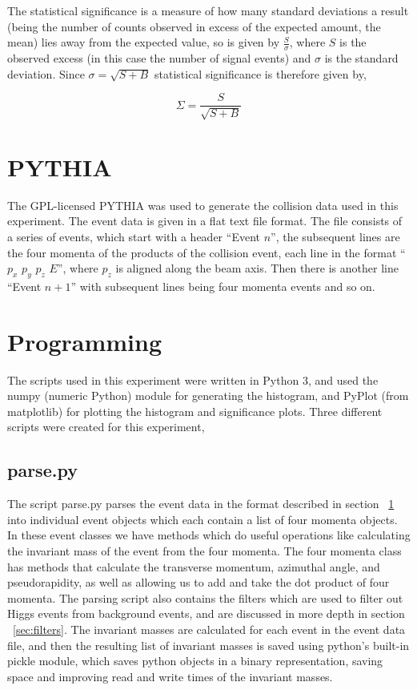 \documentclass[11pt]{amsart}
\begin{document}
\begin{multicols}{2}
The statistical significance is a measure of how many standard deviations a result (being the number of counts observed in excess of the expected amount, the mean) lies away from the expected value, so is given by $\frac{S}{\sigma}$, where $S$ is the observed excess (in this case the number of signal events) and $\sigma$ is the standard deviation. Since $\sigma = \sqrt{S + B}$ statistical significance is therefore given by,

\begin{equation}
  \label{eq:significance}
  \Sigma = \frac{S}{\sqrt{S + B}}
\end{equation}

\section{PYTHIA}
\label{sec:pythia}

The GPL-licensed PYTHIA was used to generate the collision data used in this experiment. \cite{pythia} The event data is given in a flat text file format. The file consists of a series of events, which start with a header ``Event $n$'', the subsequent lines are the four momenta of the products of the collision event, each line in the format ``$p_x$ $p_y$ $p_z$ $E$'', where $p_z$ is aligned along the beam axis. Then there is another line ``Event $n+1$'' with subsequent lines being four momenta events and so on.

\section{Programming}

The scripts used in this experiment were written in Python 3, and used the numpy (numeric Python) module for generating the histogram, and PyPlot (from matplotlib) for plotting the histogram and significance plots. Three different scripts were created for this experiment,

\subsection{parse.py}

The script parse.py parses the event data in the format described in section ~\ref{sec:pythia} into individual event objects which each contain a list of four momenta objects. In these event classes we have methods which do useful operations like calculating the invariant mass of the event from the four momenta. The four momenta class has methods that calculate the transverse momentum, azimuthal angle, and pseudorapidity, as well as allowing us to add and take the dot product of four momenta. The parsing script also contains the filters which are used to filter out Higgs events from background events, and are discussed in more depth in section ~\ref{sec:filters}. The invariant masses are calculated for each event in the event data file, and then the resulting list of invariant masses is saved using python's built-in pickle module, which saves python objects in a binary representation, saving space and improving read and write times of the invariant masses.


\end{multicols}
\end{document}
